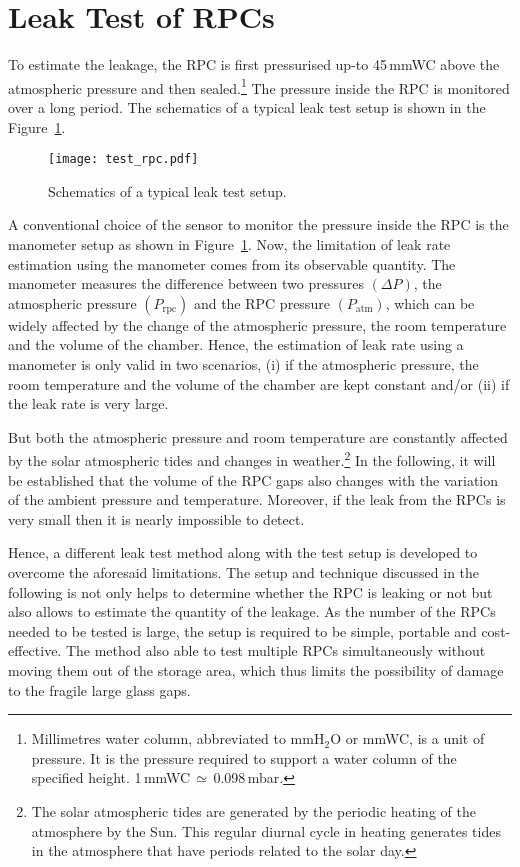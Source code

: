 \section{Leak Test of RPCs}
To estimate the leakage, the RPC is first pressurised up-to 45\,mmWC above the
atmospheric pressure and then sealed.\footnote{Millimetres water column, abbreviated to mmH$_2$O or mmWC, is a unit of pressure. It is the pressure required to support a water column of the specified height. 1\,mmWC\,$\simeq$\,0.098\,mbar.}
The pressure inside the RPC is monitored over a long period. The schematics of
a typical leak test setup is shown in the Figure~\ref{fig:test_rpc}. 
\begin{figure}
  \centering
  \texttt{[image: test\_rpc.pdf]}
  \caption{Schematics of a typical leak test setup.}
  \label{fig:test_rpc}
\end{figure}
A conventional choice of the sensor to monitor the pressure inside the RPC is
the manometer setup as shown in Figure~\ref{fig:test_rpc}. Now, the limitation
of leak rate estimation using the manometer comes from its observable quantity.
The manometer measures the difference between two pressures
$\left(\Delta P\right)$, the atmospheric pressure $\left(P_{\mathrm{rpc}}\right)$
and the RPC pressure $\left(P_{\mathrm{atm}}\right)$, which can be widely affected
by the change of the atmospheric pressure, the room temperature and the volume
of the chamber. Hence, the estimation of leak rate using a manometer is only
valid in two scenarios, (i) if the atmospheric pressure, the room temperature
and the volume of the chamber are kept constant and/or (ii) if the leak rate is
very large.

But both the atmospheric pressure and room temperature are constantly affected
by the solar atmospheric tides and changes in weather.\footnote{The solar atmospheric tides are generated by the periodic heating of the atmosphere by the Sun. This regular diurnal cycle in heating generates tides in the atmosphere that have periods related to the solar day.}
In the following, it will be established that the volume of the RPC gaps also
changes with the variation of the ambient pressure and temperature. Moreover,
if the leak from the RPCs is very small then it is nearly impossible to detect.

Hence, a different leak test method along with the test setup is developed to
overcome the aforesaid limitations. The setup and technique discussed in the
following is not only helps to determine whether the RPC is leaking or not but
also allows to estimate the quantity of the leakage. As the number of the RPCs
needed to be tested is large, the setup is required to be simple, portable and
cost-effective. The method also able to test multiple RPCs simultaneously
without moving them out of the storage area, which thus limits the possibility
of damage to the fragile large glass gaps.

